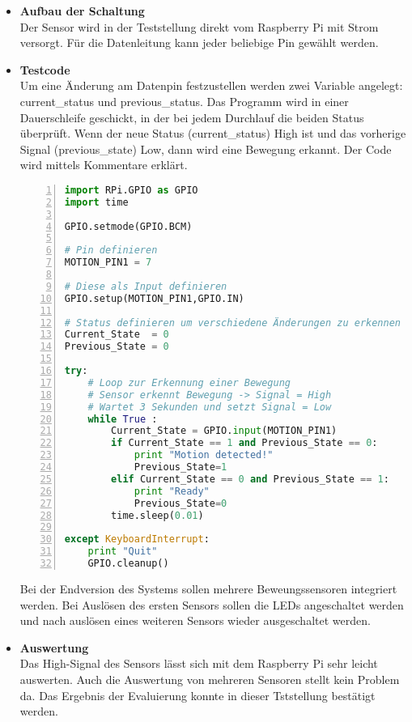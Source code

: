 \begin{itemize}
\item \textbf{Aufbau der Schaltung} \\
Der Sensor wird in der Teststellung direkt vom Raspberry Pi mit Strom versorgt. Für die Datenleitung kann jeder beliebige Pin gewählt werden. 
\item \textbf{Testcode} \\
Um eine Änderung am Datenpin festzustellen werden zwei Variable angelegt: current\_status und previous\_status. Das Programm wird in einer Dauerschleife geschickt, in der bei jedem Durchlauf die beiden Status überprüft. Wenn der neue Status (current\_status) High ist und das vorherige Signal (previous\_state) Low, dann wird eine Bewegung erkannt. Der Code wird mittels Kommentare erklärt.	

\begin{lstlisting}[caption = Testcode zur Bewegungserkennung mit Sensor, language=python, frame=single, breaklines=true,columns=fullflexible, commentstyle=\color{gray}\upshape, captionpos=b, numbers = left]
import RPi.GPIO as GPIO
import time

GPIO.setmode(GPIO.BCM)
	
# Pin definieren
MOTION_PIN1 = 7
	
# Diese als Input definieren
GPIO.setup(MOTION_PIN1,GPIO.IN)

# Status definieren um verschiedene Änderungen zu erkennen
Current_State  = 0
Previous_State = 0
					
try:
	# Loop zur Erkennung einer Bewegung
	# Sensor erkennt Bewegung -> Signal = High
	# Wartet 3 Sekunden und setzt Signal = Low
	while True :
		Current_State = GPIO.input(MOTION_PIN1)
		if Current_State == 1 and Previous_State == 0:
			print "Motion detected!"
			Previous_State=1
		elif Current_State == 0 and Previous_State == 1:
			print "Ready"
			Previous_State=0
		time.sleep(0.01)
	
except KeyboardInterrupt:
	print "Quit"
	GPIO.cleanup()
\end{lstlisting}
Bei der Endversion des Systems sollen mehrere Beweungssensoren integriert werden. Bei Auslösen des ersten Sensors sollen die LEDs angeschaltet werden und nach auslösen eines weiteren Sensors wieder ausgeschaltet werden. 
\item \textbf{Auswertung}\\
Das High-Signal des Sensors lässt sich mit dem Raspberry Pi sehr leicht auswerten. Auch die Auswertung von mehreren Sensoren stellt kein Problem da. Das Ergebnis der Evaluierung konnte in dieser Tststellung bestätigt werden. 
\end{itemize}

